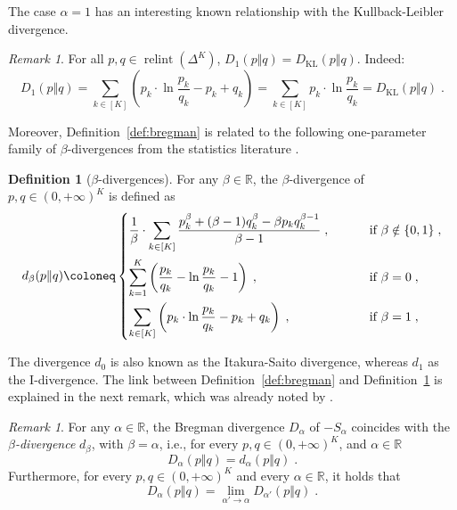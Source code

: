 \documentclass[11pt,oneside,a4paper]{article}
\newcommand{\R}{\mathbb{R}}
\newcommand{\lrb}[1]{\left(#1\right)}
\newcommand{\lcb}[1]{\left\{#1\right\}}
\theoremstyle{plain}
\theoremstyle{definition}
\newtheorem{definition}[theorem]{Definition}
\theoremstyle{remark}
\newtheorem{remark}[theorem]{Remark}
\newcommand{\simplex}[1]{\Delta^{#1}}
\DeclareMathOperator*{\relint}{relint}
\newcommand{\KL}{D_{\mathrm{KL}}}
\begin{document}
The case $\alpha = 1$ has an interesting known relationship with the Kullback-Leibler divergence.
\begin{remark}
    \label{r:kullback-leibler}
    For all $p,q \in \relint\lrb{\simplex{K}}$, $D_1(p\Vert q) = \KL(p\Vert q)$. Indeed:
\[
    D_1(p\Vert q)
=
    \sum_{k \in [K]} \lrb{ p_k \cdot\ln\frac{p_k}{q_k} - p_k + q_k}
=
    \sum_{k \in [K]}  p_k \cdot\ln\frac{p_k}{q_k}
=
    \KL(p\Vert q)
    \;.
\]
\end{remark}
Moreover, Definition~\ref{def:bregman} is related to the following one-parameter family of $\beta$-divergences from the statistics literature \citep{hennequin2010beta,fevotte2011algorithms}.
\begin{definition}[$\beta$-divergences]
\label{def:beta}
For any $\beta \in \R$, the $\beta$-divergence of $p,q \in (0,+\infty)^K$ is defined as
\[
    d_\beta(p \Vert q)
\coloneq
    \begin{cases}
    \vspace{1ex}
        \displaystyle    \frac{1}{\beta} \cdot \sum_{k \in [K]} \frac{p_k^\beta + (\beta-1)q_k^\beta-\beta p_kq_k^{\beta-1}}{\beta-1}
    \;,\qquad &\text{ if $\beta \notin\lcb{0,1}$}\;,\\
    \vspace{1ex}
    \displaystyle\sum_{k=1}^K
    \lrb{ \frac{p_k}{q_k} -\ln\frac{p_k}{q_k} -1 } \;,\qquad  &\text{ if $\beta = 0$}\;,\\
    \displaystyle \sum_{k \in [K]} \lrb{ p_k \cdot\ln\frac{p_k}{q_k} - p_k + q_k} \;,\qquad  &\text{ if $\beta = 1$}\;,
\end{cases}    
\]
\end{definition}
The divergence $d_0$ is also known as the Itakura-Saito divergence, whereas $d_1$ as the I-divergence.
The link between Definition~\ref{def:bregman} and Definition~\ref{def:beta} is explained in the next remark, which was already noted by \cite{hennequin2010beta}.
\begin{remark}
    \label{r:beta-divergences}
For any $\alpha \in \R$, the Bregman divergence $D_\alpha$ of $-S_\alpha$ coincides with the \emph{$\beta$-divergence} $d_\beta$, with $\beta = \alpha$, i.e., for every $p,q \in (0,+\infty)^K$, and $\alpha \in \R$
\[
    D_\alpha(p\Vert q) = d_\alpha(p\Vert q)\;.
\]
Furthermore, for every $p,q \in (0,+\infty)^K$ and every $\alpha \in \R$, it holds that
\[
    D_\alpha(p \Vert q) = \lim_{\alpha' \to \alpha} D_{\alpha'}(p \Vert q)\;.
\]
\end{remark}
\end{document}
